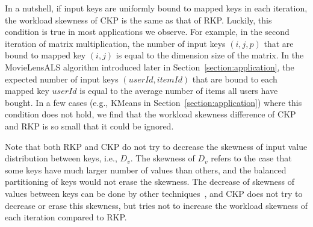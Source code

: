 \documentclass[10pt,journal,compsoc]{IEEEtran}
\begin{document}

In a nutshell, if input keys are uniformly bound to mapped keys in each
iteration, the workload skewness of CKP is the same as that of RKP. 
Luckily, this condition is true in most applications we observe.
For example, in the second iteration of matrix multiplication, 
the number of input keys $(i,j,p)$ that
are bound to mapped key $(i,j)$ is equal to the dimension size of the matrix.
In the MovieLensALS algorithm introduced later in Section~\ref{section:application}, the expected number of input keys $(userId, itemId)$
that are bound to each mapped key $userId$ is equal to the average number of
items all users have bought.
In a few cases (e.g., KMeans in Section~\ref{section:application}) where
this condition does not hold,
we find that the workload skewness difference of CKP and RKP is so small
that it could be ignored.%

Note that both RKP and CKP do not try to decrease the skewness of
input value distribution between keys, i.e., $D_v$.
The skewness of $D_v$ refers to the case that some keys have much larger 
number of values than others, and the balanced partitioning of keys 
would not erase the skewness. 
The decrease of skewness of values between keys can be done by other 
techniques~\cite{kwon2010skew, kwon2012skewtune}, 
and CKP does not try to decrease or erase this skewness, but tries not to 
increase the workload skewness of each iteration compared to RKP. 
\end{document}
